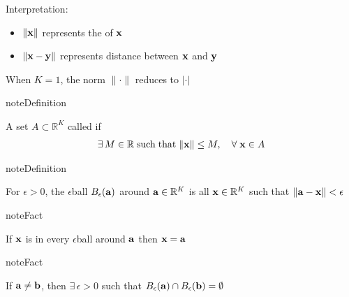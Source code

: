 \documentclass[letterpaper,10pt,english]{jupyterBook}
\begin{document}
\sphinxAtStartPar
Interpretation:
\begin{itemize}
\item {} 
\sphinxAtStartPar
\(\| {\bf x} \|\) represents the  of \({\bf x}\)

\item {} 
\sphinxAtStartPar
\(\| {\bf x} - {\bf y} \|\) represents distance between \({\bf x}\) and \({\bf y}\)

\end{itemize}

\sphinxAtStartPar
When \(K=1\), the norm \(\| \cdot \|\) reduces to \(|\cdot|\)

\begin{sphinxadmonition}{note}{Definition}

\sphinxAtStartPar
A set \(A \subset \mathbb{R}^K\) called  if
\begin{equation*}
\begin{split}
%
\exists \, M \in \mathbb{R} 
\; \mathrm{such\;that} \;
\|{\bf x}\| \leq M, \quad \forall \; {\bf x} \in A
%
\end{split}
\end{equation*}\end{sphinxadmonition}

\begin{sphinxadmonition}{note}{Definition}

\sphinxAtStartPar
For \(\epsilon > 0\), the \(\epsilon\)\sphinxhyphen{}ball \(B_{\epsilon}({\bf a})\) around
\({\bf a} \in \mathbb{R}^K\) is all \({\bf x} \in \mathbb{R}^K\) such that \(\|{\bf a} - {\bf x}\|
< \epsilon\)
\end{sphinxadmonition}

\begin{figure}[htbp]
\centering

\noindent{}
\end{figure}

\begin{sphinxadmonition}{note}{Fact}

\sphinxAtStartPar
If \({\bf x}\) is in every \(\epsilon\)\sphinxhyphen{}ball around \({\bf a}\) then
\({\bf x}={\bf a}\)
\end{sphinxadmonition}

\begin{sphinxadmonition}{note}{Fact}

\sphinxAtStartPar
If \({\bf a} \ne {\bf b}\), then \(\exists \, \epsilon > 0\) such that
\(B_\epsilon({\bf a}) \cap B_\epsilon({\bf b}) = \emptyset\)
\end{sphinxadmonition}
\end{document}
